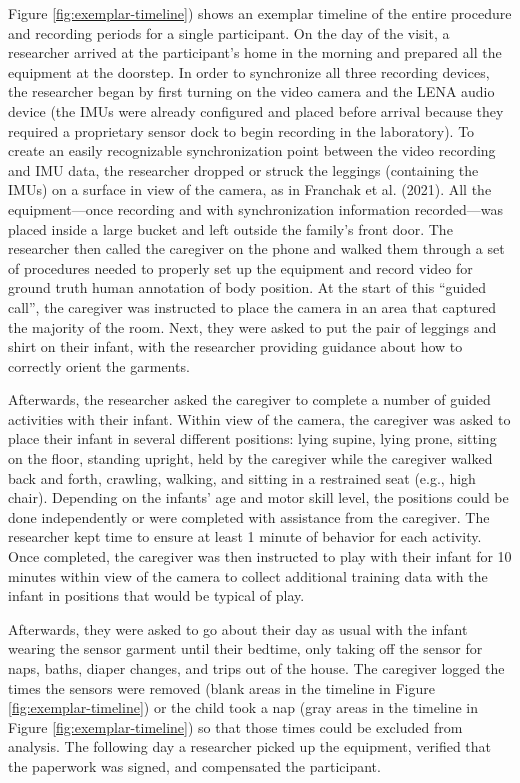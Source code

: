 \documentclass[
  man]{apa6}
\begin{document}
Figure \ref{fig:exemplar-timeline}) shows an exemplar timeline of the entire procedure and recording periods for a single participant. On the day of the visit, a researcher arrived at the participant's home in the morning and prepared all the equipment at the doorstep. In order to synchronize all three recording devices, the researcher began by first turning on the video camera and the LENA audio device (the IMUs were already configured and placed before arrival because they required a proprietary sensor dock to begin recording in the laboratory). To create an easily recognizable synchronization point between the video recording and IMU data, the researcher dropped or struck the leggings (containing the IMUs) on a surface in view of the camera, as in Franchak et al. (2021). All the equipment---once recording and with synchronization information recorded---was placed inside a large bucket and left outside the family's front door. The researcher then called the caregiver on the phone and walked them through a set of procedures needed to properly set up the equipment and record video for ground truth human annotation of body position. At the start of this ``guided call'', the caregiver was instructed to place the camera in an area that captured the majority of the room. Next, they were asked to put the pair of leggings and shirt on their infant, with the researcher providing guidance about how to correctly orient the garments.

Afterwards, the researcher asked the caregiver to complete a number of guided activities with their infant. Within view of the camera, the caregiver was asked to place their infant in several different positions: lying supine, lying prone, sitting on the floor, standing upright, held by the caregiver while the caregiver walked back and forth, crawling, walking, and sitting in a restrained seat (e.g., high chair). Depending on the infants' age and motor skill level, the positions could be done independently or were completed with assistance from the caregiver. The researcher kept time to ensure at least 1 minute of behavior for each activity. Once completed, the caregiver was then instructed to play with their infant for 10 minutes within view of the camera to collect additional training data with the infant in positions that would be typical of play.

Afterwards, they were asked to go about their day as usual with the infant wearing the sensor garment until their bedtime, only taking off the sensor for naps, baths, diaper changes, and trips out of the house. The caregiver logged the times the sensors were removed (blank areas in the timeline in Figure \ref{fig:exemplar-timeline}) or the child took a nap (gray areas in the timeline in Figure \ref{fig:exemplar-timeline}) so that those times could be excluded from analysis. The following day a researcher picked up the equipment, verified that the paperwork was signed, and compensated the participant.
\end{document}
